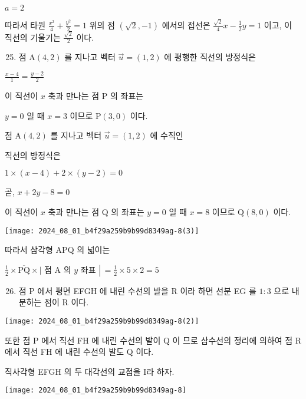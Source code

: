 \documentclass[10pt]{article}
\begin{document}
$a=2$

따라서 타원 $\frac{x^{2}}{4}+\frac{y^{2}}{2}=1$ 위의 점 $(\sqrt{2},-1)$ 에서의 접선은 $\frac{\sqrt{2}}{4} x-\frac{1}{2} y=1$ 이고, 이 직선의 기울기는 $\frac{\sqrt{2}}{2}$ 이다.

\begin{enumerate}
  \setcounter{enumi}{24}
  \item 점 $\mathrm{A}(4,2)$ 를 지나고 벡터 $\vec{u}=(1,2)$ 에 평행한 직선의 방정식은
\end{enumerate}

$\frac{x-4}{1}=\frac{y-2}{2}$

이 직선이 $x$ 축과 만나는 점 P 의 좌표는

$y=0$ 일 때 $x=3$ 이므로 $\mathrm{P}(3,0)$ 이다.

점 $\mathrm{A}(4,2)$ 를 지나고 벡터 $\vec{u}=(1,2)$ 에 수직인

직선의 방정식은

$1 \times(x-4)+2 \times(y-2)=0$

곧, $x+2 y-8=0$

이 직선이 $x$ 축과 만나는 점 Q 의 좌표는 $y=0$ 일 때 $x=8$ 이므로 $\mathrm{Q}(8,0)$ 이다.

\begin{center}
\texttt{[image: 2024\_08\_01\_b4f29a259b9b99d8349ag-8(3)]}
\end{center}

따라서 삼각형 APQ 의 넓이는

$\frac{1}{2} \times \overline{\mathrm{PQ}} \times \mid$ 점 A 의 $y$ 좌표 $\left\lvert\,=\frac{1}{2} \times 5 \times 2=5\right.$

\begin{enumerate}
  \setcounter{enumi}{25}
  \item 점 P 에서 평면 EFGH 에 내린 수선의 발을 R 이라 하면 선분 EG 를 $1: 3$ 으로 내분하는 점이 R 이다.
\end{enumerate}

\begin{center}
\texttt{[image: 2024\_08\_01\_b4f29a259b9b99d8349ag-8(2)]}
\end{center}

또한 점 P 에서 직선 FH 에 내린 수선의 발이 Q 이 므로 삼수선의 정리에 의하여 점 R 에서 직선 FH 에 내린 수선의 발도 Q 이다.

직사각형 EFGH 의 두 대각선의 교점을 I라 하자.

\begin{center}
\texttt{[image: 2024\_08\_01\_b4f29a259b9b99d8349ag-8]}
\end{center}
\end{document}
